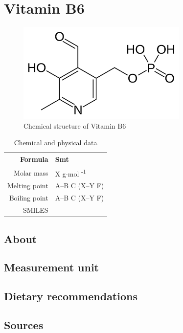 \documentclass{book}
\begin{document}
\chapter{Vitamin B6}
\begin{figure}[h]
	\caption{Chemical structure of Vitamin B6}
	\centering \includegraphics[width=0.75\textwidth]{images/Vitamin_B6_chemical_structure}
\end{figure}

\begin{table}[h]
	\caption{Chemical and physical data}
	\centering \begin{tabular}{| r | l |}
		\hline
		Formula & Smt\\ \hline
		Molar mass & X g$\cdot$mol \textsuperscript{-1}\\ \hline
		Melting point & A--B \degree C (X--Y \degree F)\\ \hline
		Boiling point & A--B \degree C (X--Y \degree F)\\ \hline
		SMILES & \\ \hline
	\end{tabular}
\end{table}
\newpage

\section{About}


\section{Measurement unit}


\section{Dietary recommendations}


\section{Sources}
\end{document}
